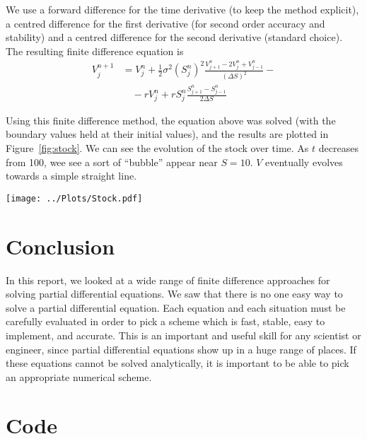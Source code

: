 \documentclass[twocolumn]{myarticle}
\begin{document}
We use a forward difference for the time derivative (to keep the method explicit), a centred difference for the first derivative (for second order accuracy and stability) and a centred difference for the second derivative (standard choice).
The resulting finite difference equation is
\begin{align}
    V^{n+1}_j &= V^n_j + \frac{1}{2} \sigma^2 \left( S^n_j \right)^2 \frac{V^n_{j+1} - 2 V^n_j + V^n_{j-1}}{(\Delta S)^2} - \nonumber
    \\
    & \quad - r V^n_j + r S^n_j \frac{S^n_{j+1} - S^n_{j-1}}{2 \Delta S}
\end{align}

Using this finite difference method, the equation above was solved (with the boundary values held at their initial values), and the results are plotted in Figure~\ref{fig:stock}.
We can see the evolution of the stock over time.
As $ t $ decreases from 100, wee see a sort of ``bubble'' appear near $ S = 10 $.
$ V $ eventually evolves towards a simple straight line.

\begin{figure*}[ht]
    \centering
    \texttt{[image: ../Plots/Stock.pdf]}
    \caption{Numerical solution to the Black-Scholes equation.}
    \label{fig:stock}
\end{figure*}

\section{Conclusion}
\label{sec:conclusion}

In this report, we looked at a wide range of finite difference approaches for solving partial differential equations.
We saw that there is no one easy way to solve a partial differential equation.
Each equation and each situation must be carefully evaluated in order to pick a scheme which is fast, stable, easy to implement, and accurate.
This is an important and useful skill for any scientist or engineer, since partial differential equations show up in a huge range of places.
If these equations cannot be solved analytically, it is important to be able to pick an appropriate numerical scheme.

\onecolumn



\section{Code}
\label{sec:code}
\end{document}
